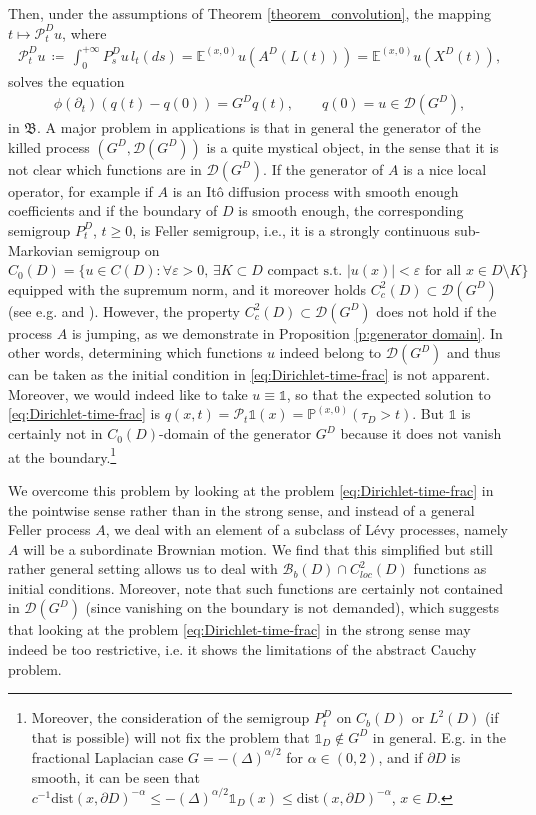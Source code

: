 \documentclass[reqno]{amsart}
\theoremstyle{remark}
\numberwithin{equation}{section} %
\newcommand{\EE}{\mathds{E}}
\newcommand{\PP}{\mathds{P}}
\newcommand{\BB}{\mathcal{B}}
\newcommand{\DD}{\mathcal{D}}
\newcommand{\dist}{\text{dist}}
\newcommand{\1}{\mathds{1}}
\begin{document}
	Then, under the assumptions of Theorem \ref{theorem_convolution}, the mapping $t \mapsto \mathcal{P}_t^Du$, where 
	\begin{align}
		\mathcal{P}_t^Du \, \coloneqq \, \int_0^{+\infty} P_s^D u \, l_t(ds)=\EE^{(x,0)} u(A^D(L(t)))=\EE^{(x,0)} u(X^D(t)),
	\end{align}
	solves the equation
	\begin{align}\label{eq:Dirichlet-time-frac}
		\phi(\partial_t) (q(t)-q(0)) = G^Dq(t), \qquad q(0) = u \in \mathcal{D}(G^D),
	\end{align}
	in $\mathfrak{B}$.
	A major problem in applications is that in general the generator of the killed process $(G^D,\mathcal{D}(G^D))$ is a quite mystical object, in the sense that it is not clear which functions are in $\DD(G^D)$. If the generator of $A$ is a nice local operator, for example if $A$ is an It\^o diffusion process with smooth enough coefficients and if the boundary of $D$ is smooth enough, the corresponding semigroup $P_t^D$, $t\ge0$, is Feller semigroup, i.e., it is a strongly continuous sub-Markovian semigroup on $C_0(D) = \{ u \in C({D}): \forall \varepsilon>0, \, \exists K\subset D \text{ compact s.t. } |u(x)|<\varepsilon \text{ for all $x\in D\setminus K$}\}$ equipped with the supremum norm, and it moreover holds $C_c^2(D) \subset \mathcal{D}(G^D)$ (see e.g. \cite[Theorem 21.28]{SchillingBMSC} and \cite[Theorem 2.3]{BaeumerLuksMeersc-SpaceTime18}). However, the property $C_c^2(D) \subset \mathcal{D}(G^D)$ does not hold if the process $A$ is jumping, as we demonstrate in Proposition \ref{p:generator domain}. In other words, determining which functions $u$ indeed belong to $\DD(G^D)$ and thus can be taken as the initial condition in \eqref{eq:Dirichlet-time-frac} is not apparent. Moreover, we would indeed like to take $u\equiv \1$, so that the expected solution to \eqref{eq:Dirichlet-time-frac} is $q(x,t)=\mathcal{P}_t\1(x)=\PP^{(x,0)}(\tau_D>t)$. But $\1$ is certainly  not in $C_0(D)$-domain of the generator $G^D$ because it does not vanish at the boundary.\footnote{Moreover, the consideration of the semigroup $P_t^D$ on $C_b(D)$ or $L^2(D)$ (if that is possible) will not fix the problem that $\1_D\notin G^D$ in general. E.g. in the fractional Laplacian case $G=-(\Delta)^{\alpha/2}$ for $\alpha\in (0,2)$, and if $\partial D$ is smooth, it can be seen that $c^{-1}\dist(x,\partial D)^{-\alpha}\le -(\Delta)^{\alpha/2}\1_D(x)\le \dist(x,\partial D)^{-\alpha}$, $x\in D$.}
	
	We overcome this problem by looking at the problem \eqref{eq:Dirichlet-time-frac} in the pointwise sense rather than in the strong sense, and instead of a general Feller process $A$, we deal with an element of a subclass of L\'evy processes, namely $A$ will be a subordinate Brownian motion. We find that this simplified but still rather general setting allows us to deal with $\BB_b(D)\cap C^2_{loc}(D)$ functions as initial conditions. Moreover, note that such functions are certainly not contained in $\DD(G^D)$ (since vanishing on the boundary is not demanded), which suggests that looking at the problem \eqref{eq:Dirichlet-time-frac} in the strong sense may indeed be too restrictive, i.e. it shows the limitations of the abstract Cauchy problem. 
	
\end{document}
